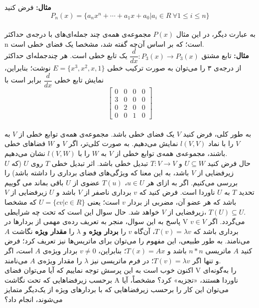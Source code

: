 \textbf{مثال: }فرض کنید \\
$$P_{n}(x) = \{ a_{n}x^n + \cdots + a_{1}x + a_{0} | a_{i}\in R \ \forall 1\le i \le n \}$$\\
به عبارت دیگر، در این مثال $P(x)$ مجموعه‌ی همه‌ی چند جمله‌ای‌های با درجه‌ی حداکثر n است؛ که بر اساس آن‌چه گفته شد، مشخصا یک فضا‌ی خطی است.\\
\textbf{مثال: }تابع مشتق $\dfrac{d}{dx}: P_{3}(x) \xrightarrow{} P_{3}(x)$ یک تابع خطی است. هر چندجمله‌ای حداکثر از درجه‌ی ۳ را می‌توان به صورت ترکیب خطی $E = \{x^3,x^2,x,1\}$ نوشت؛ بنابراین، نمایش تابع خطی $\dfrac{d}{dx}$ برابر است با\\
$$\begin{bmatrix}
0 & 0 & 0 &0\\
3 & 0 & 0 &0\\
0 & 2 & 0 &0\\
0 & 0 & 1 &0
\end{bmatrix}$$\\
به طور کلی، فرض کنید $V$ یک فضا‌ی خطی باشد. مجموعه‌ی همه‌ی توابع خطی از $V$ به $V$ را با نماد $l(V,V)$ نمایش می‌دهیم. به صورت کلی‌تر، اگر $V$ و $W$ فضا‌های خطی باشند، مجموعه‌ی همه‌ی توابع خطی از $V$ به $W$ را با $l(V,W)$ نشان می‌دهیم.\\
حال فرض کنید $U\subseteq W$ و $T: V\xrightarrow{}V$ تبدیل خطی باشد. اثر تبدیل خطی $T$ روی $U$ (که $U$ زیرفضایی از $V$ باشد، به این معنا که ویژگی‌های فضای برداری را داشته باشد) را بررسی می‌کنیم. اگر به ازای هر $u \in U$، $T(u)$ عضوی از $U$ باقی بماند می‌
گوییم تحدید $T$ به $U$ ناوردا است. فرض کنید که $v$ برداری ناصفر از $V$ باشد و $U$ زیرفضا‌یی از $V$ باشد که هر عضو آن، مضربی از بردار $v$ است؛ یعنی $U = \{cv | c \in R\}$ که مشخصا زیرفضا‌یی از $V$ خواهد شد. حال سوال این است که تحت چه شرایطی، $T(U)\subseteq U$.\\
پاسخ به این سوال، منجر به تعریف رده‌ی مهمی از بردار‌ها در V می‌گردد. اگر $v \in V$ برداری باشد که $T(v) = \lambda v$، آن‌گاه $v$ را \textbf{بردار ویژه} و $\lambda$ را \textbf{مقدار ویژه} نگاشت $A$ می‌نامند. به طور طبیعی، این مفهوم را می‌توان برای ماتریس‌ها نیز تعریف کرد؛ فرض کنید $A$ ماتریسی $n*n$ باشد و $T(x) = Ax$؛ بنابراین، $v \neq 0$ بردار ویژه‌ی $A$ است، اگر و تنها اگر $T(v) = \lambda v$؛ در فرم ماتریسی نیز $\lambda$ را مقدار ویژه‌ی $A$ می‌نامند.\\
اکنون خوب است به این پرسش توجه نماییم که آیا می‌توان فضای V را به‌گونه‌ای برحسب زیرفضاهایی که تحت نگاشت A ناوردا هستند، «تجزیه» کرد؟ مشخصاً، آیا می‌توان این کار را برحسب زیرفضاهایی که با بردارهای ویژه از یک‌دیگر متمایز می‌شوند، انجام داد؟ \\
